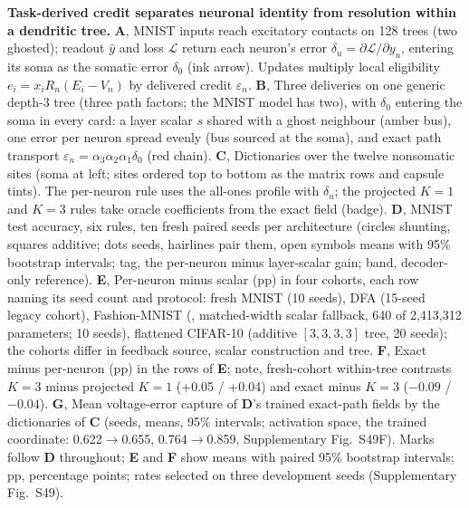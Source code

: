\textbf{Task-derived credit separates neuronal identity from resolution within a dendritic tree.}
\textbf{A}, MNIST inputs reach excitatory contacts on 128 trees (two ghosted); readout $\hat y$ and loss $\mathcal L$ return each neuron's error $\delta_u=\partial\mathcal L/\partial y_u$, entering its soma as the somatic error $\delta_0$ (ink arrow). Updates multiply local eligibility $e_i=x_iR_n(E_i-V_n)$ by delivered credit $\varepsilon_n$.
\textbf{B}, Three deliveries on one generic depth-3 tree (three path factors; the MNIST model has two), with $\delta_0$ entering the soma in every card: a layer scalar $s$ shared with a ghost neighbour (amber bus), one error per neuron spread evenly (bus sourced at the soma), and exact path transport $\varepsilon_n=\alpha_3\alpha_2\alpha_1\delta_0$ (red chain).
\textbf{C}, Dictionaries over the twelve nonsomatic sites (soma at left; sites ordered top to bottom as the matrix rows and capsule tints). The per-neuron rule uses the all-ones profile with $\delta_u$; the projected $K=1$ and $K=3$ rules take oracle coefficients from the exact field (badge).
\textbf{D}, MNIST test accuracy, six rules, ten fresh paired seeds per architecture (circles shunting, squares additive; dots seeds, hairlines pair them, open symbols means with 95\% bootstrap intervals; tag, the per-neuron minus layer-scalar gain; band, decoder-only reference).
\textbf{E}, Per-neuron minus scalar (pp) in four cohorts, each row naming its seed count and protocol: fresh MNIST (10 seeds), DFA (15-seed legacy cohort), Fashion-MNIST (\dag, matched-width scalar fallback, 640 of 2,413,312 parameters; 10 seeds), flattened CIFAR-10 (additive $[3,3,3,3]$ tree, 20 seeds); the cohorts differ in feedback source, scalar construction and tree.
\textbf{F}, Exact minus per-neuron (pp) in the rows of \textbf{E}; note, fresh-cohort within-tree contrasts $K=3$ minus projected $K=1$ (+0.05 / +0.04) and exact minus $K=3$ ($-0.09$ / $-0.04$).
\textbf{G}, Mean voltage-error capture of \textbf{D}'s trained exact-path fields by the dictionaries of \textbf{C} (seeds, means, 95\% intervals; activation space, the trained coordinate: 0.622$\to$0.655, 0.764$\to$0.859, Supplementary Fig.~S49F).
Marks follow \textbf{D} throughout; \textbf{E} and \textbf{F} show means with paired 95\% bootstrap intervals; pp, percentage points; rates selected on three development seeds (Supplementary Fig.~S49).
